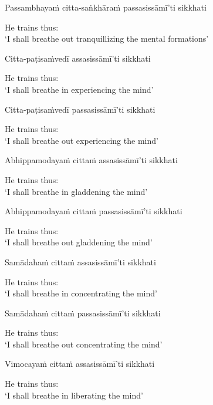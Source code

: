 Passambhayaṁ citta-saṅkhāraṁ passasissāmī'ti sikkhati

\begin{english}
  He trains thus:\\
  `I shall breathe out tranquillizing the mental formations'
\end{english}

Citta-paṭisaṁvedī assasissāmī'ti sikkhati

\begin{english}
  He trains thus:\\
  `I shall breathe in experiencing the mind'
\end{english}

Citta-paṭisaṁvedī passasissāmī'ti sikkhati

\begin{english}
  He trains thus:\\
  `I shall breathe out experiencing the mind'
\end{english}

Abhippamodayaṁ cittaṁ assasissāmī'ti sikkhati

\begin{english}
  He trains thus:\\
  `I shall breathe in gladdening the mind'
\end{english}

Abhippamodayaṁ cittaṁ passasissāmī'ti sikkhati

\begin{english}
  He trains thus:\\
  `I shall breathe out gladdening the mind'
\end{english}

Samādahaṁ cittaṁ assasissāmī'ti sikkhati

\begin{english}
  He trains thus:\\
  `I shall breathe in concentrating the mind'
\end{english}

Samādahaṁ cittaṁ passasissāmī'ti sikkhati

\begin{english}
  He trains thus:\\
  `I shall breathe out concentrating the mind'
\end{english}

Vimocayaṁ cittaṁ assasissāmī'ti sikkhati

\begin{english}
  He trains thus:\\
  `I shall breathe in liberating the mind'
\end{english}

